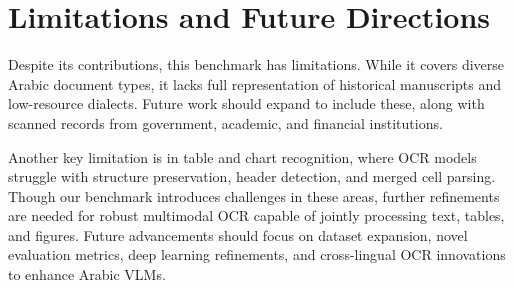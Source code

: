 \section{Limitations and Future Directions}

Despite its contributions, this benchmark has limitations. While it covers diverse Arabic document types, it lacks full representation of historical manuscripts and low-resource dialects. Future work should expand to include these, along with scanned records from government, academic, and financial institutions.

Another key limitation is in table and chart recognition, where OCR models struggle with structure preservation, header detection, and merged cell parsing. Though our benchmark introduces challenges in these areas, further refinements are needed for robust multimodal OCR capable of jointly processing text, tables, and figures. Future advancements should focus on dataset expansion, novel evaluation metrics, deep learning refinements, and cross-lingual OCR innovations to enhance Arabic VLMs.

